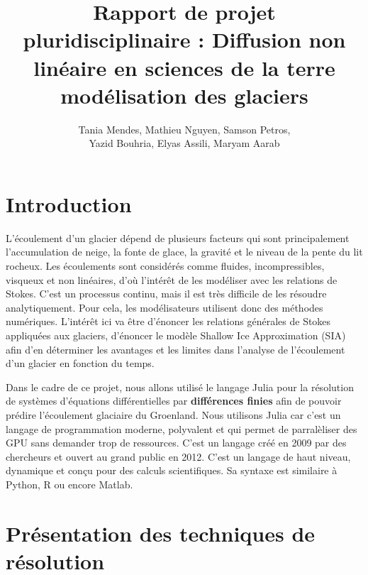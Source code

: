 \documentclass{article}
\title{\vspace{\fill}\textbf{ Rapport de projet pluridisciplinaire :} \newline Diffusion non linéaire en sciences de la terre modélisation des glaciers\vspace{\fill}}
\author{Tania Mendes, Mathieu Nguyen, Samson Petros,\\ Yazid Bouhria, Elyas Assili, Maryam Aarab}
\affil{\textbf{Encadrante} : Laetitia Le Pourhiet}
\begin{document}
\maketitle 

\newpage

\tableofcontents

\newpage
\section*{Introduction}

L’écoulement d’un glacier dépend de plusieurs facteurs qui sont principalement l’accumulation de neige, la fonte de glace, la gravité et le niveau de la pente du lit rocheux.
Les écoulements sont considérés comme fluides, incompressibles, visqueux et non linéaires, d’où l’intérêt de les modéliser avec les relations de Stokes.
\newline
C'est un processus continu, mais il est très difficile de les résoudre analytiquement. Pour cela, les modélisateurs utilisent donc des méthodes numériques.
L’intérêt ici va être d’énoncer les relations générales de Stokes appliquées aux glaciers, d’énoncer le modèle Shallow Ice Approximation (SIA) afin d’en déterminer les avantages et les limites dans l’analyse de l’écoulement d’un glacier en fonction du temps.


Dans le cadre de ce projet, nous allons utilisé le langage Julia pour la résolution de systèmes d'équations différentielles par \textbf{différences finies} afin de pouvoir prédire l'écoulement glaciaire du Groenland. Nous utilisons Julia car c'est un langage de programmation moderne, polyvalent et qui permet de parralèliser des GPU sans demander trop de ressources. C'est un langage créé en 2009 par des chercheurs et ouvert au grand public en 2012. C'est un langage de haut niveau, dynamique et conçu pour des calculs scientifiques. Sa syntaxe est similaire à Python, R ou encore Matlab.


\section{Présentation des techniques de résolution}
\end{document}
